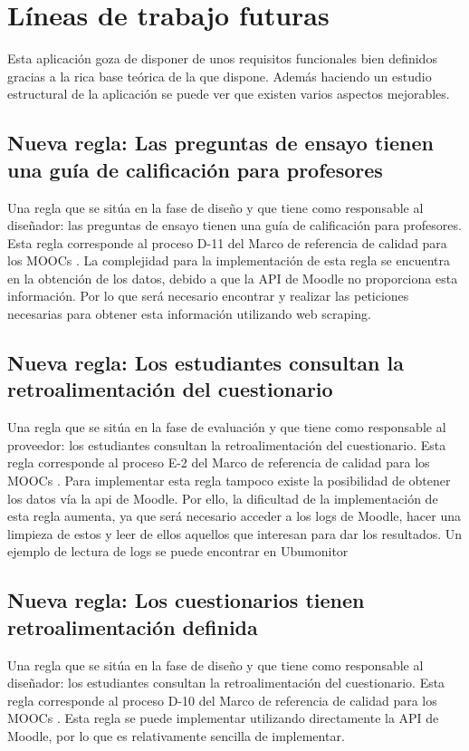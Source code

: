 \section{Líneas de trabajo futuras}
Esta aplicación goza de disponer de unos requisitos funcionales bien definidos gracias a la rica base teórica de la que dispone. Además haciendo un estudio estructural de la aplicación se puede ver que existen varios aspectos mejorables.

\subsection{Nueva regla: Las preguntas de ensayo tienen una guía de calificación para profesores}
Una regla que se sitúa en la fase de diseño y que tiene como responsable al diseñador: las preguntas de ensayo tienen una guía de calificación para profesores. Esta regla corresponde al proceso D-11 del Marco de referencia de calidad para los MOOCs \cite{quality-reference-framework}. La complejidad para la implementación de esta regla se encuentra en la obtención de los datos, debido a que la API de Moodle \cite{moodle-api} no proporciona esta información. Por lo que será necesario encontrar y realizar las peticiones necesarias para obtener esta información utilizando web scraping.

\subsection{Nueva regla: Los estudiantes consultan la retroalimentación del cuestionario}
Una regla que se sitúa en la fase de evaluación y que tiene como responsable al proveedor: los estudiantes consultan la retroalimentación del cuestionario. Esta regla corresponde al proceso E-2 del Marco de referencia de calidad para los MOOCs \cite{quality-reference-framework}. Para implementar esta regla tampoco existe la posibilidad de obtener los datos vía la api de Moodle. Por ello, la dificultad de la implementación de esta regla aumenta, ya que será necesario acceder a los logs de Moodle, hacer una limpieza de estos y leer de ellos aquellos que interesan para dar los resultados. Un ejemplo de lectura de logs se puede encontrar en Ubumonitor \cite{ubu-monitor}

\subsection{Nueva regla: Los cuestionarios tienen retroalimentación definida}
Una regla que se sitúa en la fase de diseño y que tiene como responsable al diseñador: los estudiantes consultan la retroalimentación del cuestionario. Esta regla corresponde al proceso D-10 del Marco de referencia de calidad para los MOOCs \cite{quality-reference-framework}. Esta regla se puede implementar utilizando directamente la API de Moodle, por lo que es relativamente sencilla de implementar.

